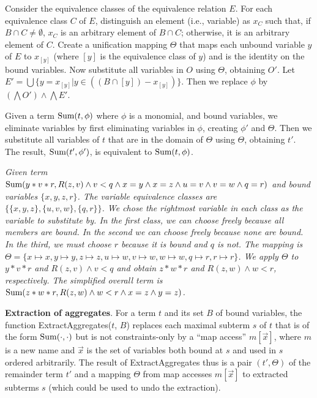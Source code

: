Consider the equivalence classes of the equivalence relation $E$.
For each equivalence class $C$ of $E$, distinguish an element
(i.e., variable) as $x_C$ such that,
if $B \cap C \neq \emptyset$, $x_C$ is an arbitrary element of $B \cap C$;
otherwise, it is an arbitrary element of $C$.
Create a unification mapping
$\Theta$ that maps each unbound variable $y$ of $E$ to $x_{[y]}$ (where $[y]$ is the
equivalence class of $y$) and is the identity on the bound variables.
Now substitute all variables in $O$
using $\Theta$, obtaining $O'$. Let
$E' =  \bigcup \{ y = x_{[y]} | y \in ((B \cap [y]) -  x_{[y]}) \}$.
Then we replace $\phi$ by $(\bigwedge O') \land \bigwedge E'$.

Given a term $\mbox{Sum}(t,\phi)$ where $\phi$ is a monomial,
and bound variables, we eliminate variables by 
first eliminating variables in $\phi$, creating $\phi'$ and $\Theta$.
Then we substitute all variables of $t$ that are in the domain of $\Theta$
using $\Theta$, obtaining $t'$. The result, $\mbox{Sum}(t', \phi')$, is equivalent
to $\mbox{Sum}(t,\phi)$.


\begin{example} \em
Given term $\mbox{Sum}(y*v*r, R(z, v) \land v<q
\land x=y \land x=z \land u=v \land v=w \land q=r)$
and bound variables $\{x,y,z,r\}$.
The variable equivalence classes are
$\{ \{x,y,z\}, \{u,v,w\}, \{q,r\} \}$. We chose the rightmost variable in
each class as the variable to substitute by. In the first class, we can choose
freely because all members are bound. In the second we can choose freely
because none are bound. In the third, we must choose $r$ because it is bound
and $q$ is not.
The mapping is
$\Theta = \{ x \mapsto x, y \mapsto y, z \mapsto z, u \mapsto w, v \mapsto w,
w \mapsto w, q \mapsto r, r \mapsto r \}$.
We apply $\Theta$ to $y*v*r$ and $R(z, v) \land v < q$ and obtain
$z*w*r$ and $R(z,w) \land w<r$, respectively. The simplified
overall term is
$\mbox{Sum}(z*w*r, R(z,w) \land w<r \land x=z \land y=z)$.
\punto
\end{example}


{\bf Extraction of aggregates}.
For a term $t$ and its set $B$ of bound variables,
the function ExtractAggregates($t$, $B$)
replaces each maximal subterm $s$ of $t$
that is of the form $\mbox{Sum}(\cdot, \cdot)$ but is not constraints-only
by a ``map access''  $m[\vec{x}]$, where
$m$ is a new name and $\vec{x}$ is the set of variables
both bound at $s$ and used in $s$ ordered arbitrarily.
The result of ExtractAggregates thus is a pair $(t', \Theta)$ of the remainder
term $t'$ and a mapping $\Theta$ from map accesses $m[\vec{x}]$ to extracted
subterms $s$ (which could be used to undo the extraction).

